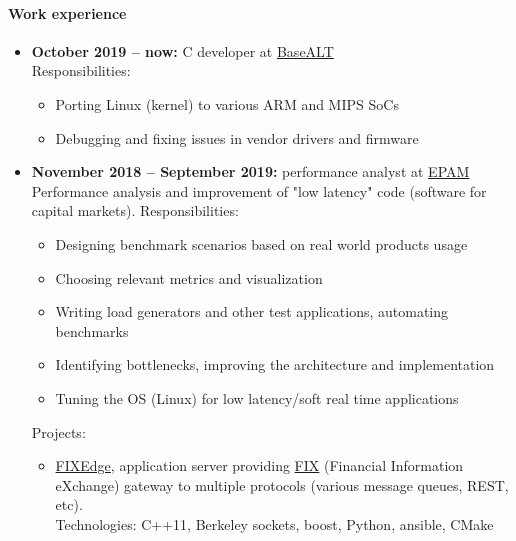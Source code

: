 \documentclass{report}
\begin{document}
\paragraph{Work experience}
\begin{itemize}
\item
  {\bf October 2019 -- now:} C developer at \href{http://basealt.ru}{BaseALT}\\
  Responsibilities:
   \begin{itemize}
     \item Porting Linux (kernel) to various ARM and MIPS SoCs
     \item Debugging and fixing issues in vendor drivers and firmware
   \end{itemize}
\item
  {\bf November 2018 -- September 2019:} performance analyst at \href{http://epam.com}{EPAM}\\
  Performance analysis and improvement of "low latency" code (software for capital markets).
  Responsibilities:
   \begin{itemize}
      \item Designing benchmark scenarios based on real world products usage
      \item Choosing relevant metrics and visualization
      \item Writing load generators and other test applications, automating benchmarks
      \item Identifying bottlenecks, improving the architecture and implementation
      \item Tuning the OS (Linux) for low latency/soft real time applications
   \end{itemize}

  Projects:
  \begin{itemize}
    \item \href{https://www.b2bits.com/trading_solutions/fixedge.html}{FIXEdge}, application server providing
          \href{https://en.wikipedia.org/wiki/Financial_Information_eXchange}{FIX} (Financial Information eXchange)
          gateway to multiple protocols (various message queues, REST, etc). \\
          Technologies: C++11, Berkeley sockets, boost, Python, ansible, CMake
  \end{itemize}


\end{itemize}
\end{document}
